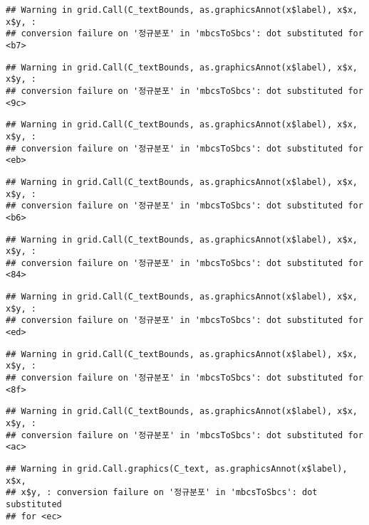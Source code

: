\documentclass[]{book}
\begin{document}
\begin{verbatim}
## Warning in grid.Call(C_textBounds, as.graphicsAnnot(x$label), x$x, x$y, :
## conversion failure on '정규분포' in 'mbcsToSbcs': dot substituted for <b7>
\end{verbatim}

\begin{verbatim}
## Warning in grid.Call(C_textBounds, as.graphicsAnnot(x$label), x$x, x$y, :
## conversion failure on '정규분포' in 'mbcsToSbcs': dot substituted for <9c>
\end{verbatim}

\begin{verbatim}
## Warning in grid.Call(C_textBounds, as.graphicsAnnot(x$label), x$x, x$y, :
## conversion failure on '정규분포' in 'mbcsToSbcs': dot substituted for <eb>
\end{verbatim}

\begin{verbatim}
## Warning in grid.Call(C_textBounds, as.graphicsAnnot(x$label), x$x, x$y, :
## conversion failure on '정규분포' in 'mbcsToSbcs': dot substituted for <b6>
\end{verbatim}

\begin{verbatim}
## Warning in grid.Call(C_textBounds, as.graphicsAnnot(x$label), x$x, x$y, :
## conversion failure on '정규분포' in 'mbcsToSbcs': dot substituted for <84>
\end{verbatim}

\begin{verbatim}
## Warning in grid.Call(C_textBounds, as.graphicsAnnot(x$label), x$x, x$y, :
## conversion failure on '정규분포' in 'mbcsToSbcs': dot substituted for <ed>
\end{verbatim}

\begin{verbatim}
## Warning in grid.Call(C_textBounds, as.graphicsAnnot(x$label), x$x, x$y, :
## conversion failure on '정규분포' in 'mbcsToSbcs': dot substituted for <8f>
\end{verbatim}

\begin{verbatim}
## Warning in grid.Call(C_textBounds, as.graphicsAnnot(x$label), x$x, x$y, :
## conversion failure on '정규분포' in 'mbcsToSbcs': dot substituted for <ac>
\end{verbatim}

\begin{verbatim}
## Warning in grid.Call.graphics(C_text, as.graphicsAnnot(x$label), x$x,
## x$y, : conversion failure on '정규분포' in 'mbcsToSbcs': dot substituted
## for <ec>
\end{verbatim}
\end{document}
